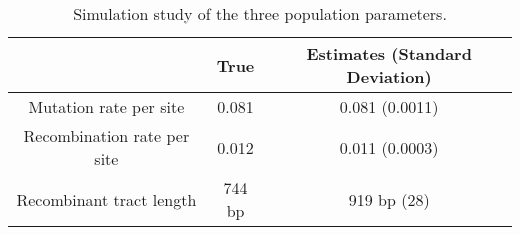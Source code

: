 \documentclass[10pt]{article}
\providecommand{\tabularnewline}{\\}
\begin{document}


\begin{table}
\caption{\label{tab:sim-three}
Simulation study of the three population parameters.}
\noindent \begin{centering}
\begin{tabular}{ccc}
\hline
 & True & Estimates (Standard Deviation)\tabularnewline
\hline
Mutation rate per site & 0.081 & 0.081 (0.0011)\tabularnewline
Recombination rate per site & 0.012 & 0.011 (0.0003)\tabularnewline
Recombinant tract length & 744 bp & 919 bp (28)\tabularnewline
\hline
\end{tabular}
\par\end{centering}
\end{table}
\end{document}

